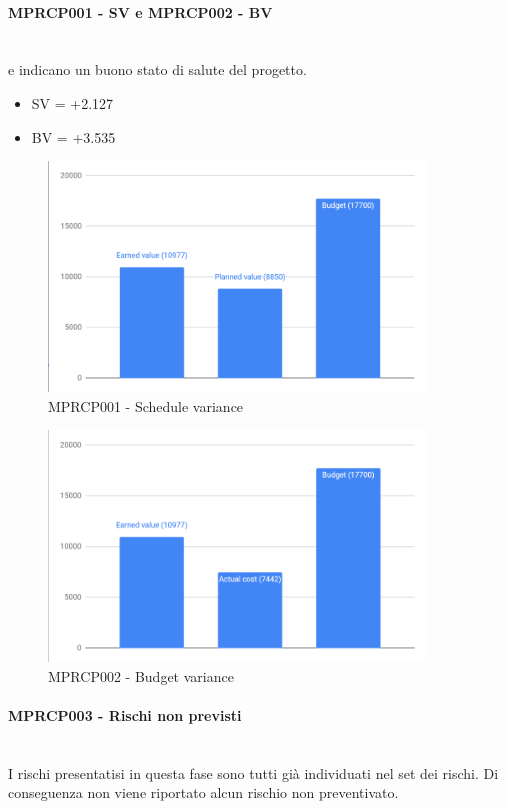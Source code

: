 \paragraph{MPRCP001 - SV e MPRCP002 -  BV}\mbox{}\\[0.4cm]
 e  indicano un buono stato di salute del progetto.
\begin{itemize}
\item SV = +2.127
\item BV = +3.535
\end{itemize}
\begin{figure}[H]
	\centering
	\includegraphics[width=10cm,keepaspectratio]{../includes/pics/SV.PNG}
	\caption{\label{fig:mission}MPRCP001 - Schedule variance}
\end{figure}
\begin{figure}[H]
	\centering
	\includegraphics[width=10cm,keepaspectratio]{../includes/pics/BV.PNG}
	\caption{\label{fig:mission}MPRCP002 - Budget variance}
\end{figure}
\paragraph{MPRCP003 - Rischi non previsti}\mbox{}\\[0.4cm]
I rischi presentatisi in questa fase sono tutti già individuati nel set dei rischi. Di conseguenza non viene riportato alcun rischio non preventivato.
